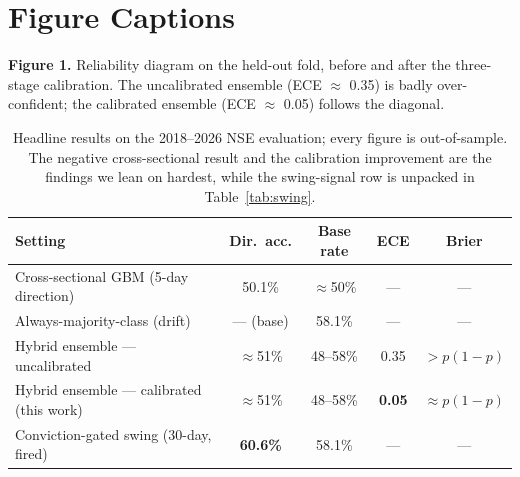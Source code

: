 \documentclass[12pt,a4paper]{article}
\begin{document}
\clearpage
\section*{Figure Captions}
\begin{singlespace}
\noindent\textbf{Figure 1.} Reliability diagram on the held-out fold, before and
after the three-stage calibration. The uncalibrated ensemble (ECE $\approx$ 0.35)
is badly over-confident; the calibrated ensemble (ECE $\approx$ 0.05) follows the
diagonal.
\end{singlespace}


\clearpage
\begin{table}[p]
\centering
\caption{Headline results on the 2018--2026 NSE evaluation; every figure is
out-of-sample. The negative cross-sectional result and the calibration improvement
are the findings we lean on hardest, while the swing-signal row is unpacked in
Table~\ref{tab:swing}.}
\label{tab:headline}
\begin{singlespace}
\small
\begin{tabular}{lcccc}
\toprule
\textbf{Setting} & \textbf{Dir.\ acc.} & \textbf{Base rate} & \textbf{ECE} & \textbf{Brier} \\
\midrule
Cross-sectional GBM (5-day direction)      & 50.1\% & $\approx$50\% & ---    & ---   \\
Always-majority-class (drift)              & --- (base) & 58.1\% & ---  & ---   \\
Hybrid ensemble --- uncalibrated           & $\approx$51\% & 48--58\% & 0.35 & $>p(1{-}p)$ \\
Hybrid ensemble --- calibrated (this work) & $\approx$51\% & 48--58\% & \textbf{0.05} & $\approx p(1{-}p)$ \\
Conviction-gated swing (30-day, fired)     & \textbf{60.6\%} & 58.1\% & --- & --- \\
\bottomrule
\end{tabular}
\end{singlespace}
\end{table}
\end{document}
